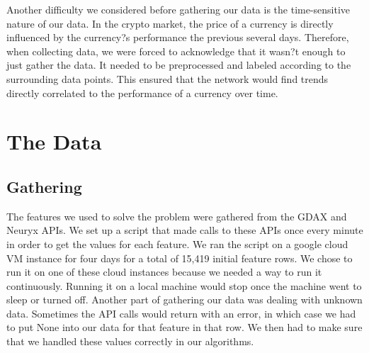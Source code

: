 \documentclass{article}
\begin{document}
Another difficulty we considered before gathering our data is the time-sensitive nature of our data. In the crypto market, the price of a currency is directly influenced by the currency?s performance the previous several days. Therefore, when collecting data, we were forced to acknowledge that it wasn?t enough to just gather the data. It needed to be preprocessed and labeled according to the surrounding data points. This ensured that the network would find trends directly correlated to the performance of a currency over time. \\

\section{ The Data }

\subsection{ Gathering }
The features we used to solve the problem were gathered from the GDAX and Neuryx APIs. We set up a script that made calls to these APIs once every minute in order to get the values for each feature. We ran the script on a google cloud VM instance for four days for a total of 15,419 initial feature rows. We chose to run it on one of these cloud instances because we needed a way to run it continuously. Running it on a local machine would stop once the machine went to sleep or turned off. 
Another part of gathering our data was dealing with unknown data. Sometimes the API calls would return with an error, in which case we had to put None into our data for that feature in that row. We then had to make sure that we handled these values correctly in our algorithms. \\
\end{document}
